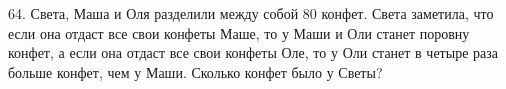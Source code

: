 64. Света, Маша и Оля разделили между собой 80 конфет. Света заметила, что если она отдаст все свои конфеты Маше, то у Маши и Оли станет поровну конфет, а если она отдаст все свои конфеты Оле, то у Оли станет в четыре раза больше конфет, чем у Маши. Сколько конфет было у Светы?\\
